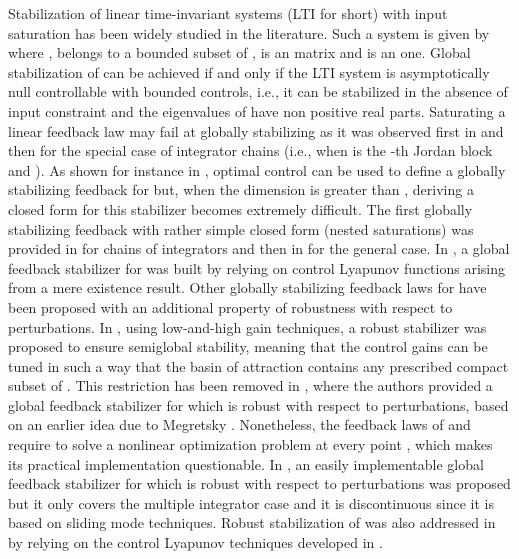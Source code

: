 \documentclass[letterpaper, 10pt]{article}
\begin{document}
Stabilization of linear time-invariant systems (LTI for short) with input saturation has been widely studied in the literature. Such a system is given by  where , 
 belongs to a bounded subset of ,  is an  matrix and  is an  one. Global stabilization of  can be achieved if and only if the LTI system is asymptotically null controllable with bounded controls, i.e., it can be stabilized in the absence of input constraint and the eigenvalues of  have non positive real parts. Saturating a linear feedback law may fail at globally stabilizing  as it was observed first in \cite{FULLER69} and then \cite{SY91} for the special case of integrator chains (i.e., when  is the -th Jordan block and ). As shown for instance in \cite{OptCRyan}, optimal control can be used to define a globally stabilizing feedback  for  but, when the dimension is greater than , deriving a closed form for this stabilizer becomes extremely difficult. The first globally stabilizing feedback with rather simple closed form (nested saturations) was provided in \cite{Teel92} for chains of integrators and then in \cite{SSY} for the general case. In \cite{Lin95control}, a global feedback stabilizer for  was built by relying on control Lyapunov functions arising from a mere existence result. Other globally stabilizing feedback laws for  have been proposed with an additional property of robustness with respect to perturbations. In \cite{Saberi:2002ux}, using low-and-high gain techniques, a robust stabilizer was proposed to ensure semiglobal stability, meaning that the control gains can be tuned in such a way that the basin of attraction contains any prescribed compact subset of . This restriction has been removed in \cite{saberi2000}, where the authors provided a global feedback stabilizer for  which is robust with respect to perturbations, based on an earlier idea due to Megretsky \cite{Megretski96bibooutput}. Nonetheless, the feedback laws of \cite{saberi2000} and \cite{Megretski96bibooutput} require to solve a nonlinear optimization problem at every point , which makes its practical implementation questionable. In \cite{chitour2015}, an easily implementable global feedback stabilizer for  which is robust with respect to perturbations was proposed but it only covers the multiple integrator case and it is discontinuous since it is based on sliding mode techniques. Robust stabilization of  was also addressed in \cite{AZCHCHGR15} by relying on the control Lyapunov techniques developed in \cite{Lin95control}.
\end{document}
